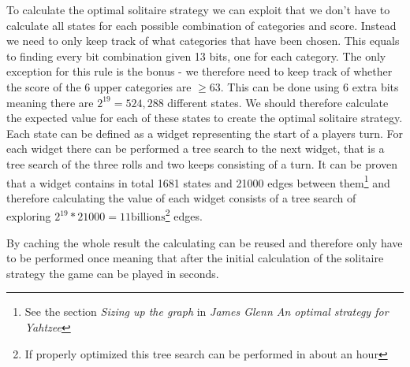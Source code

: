 To calculate the optimal solitaire strategy we can exploit that we don't have to calculate all states for each possible combination of categories and score. Instead we need to only keep track of what categories that have been chosen. This equals to finding every bit combination given 13 bits, one for each category. The only exception for this rule is the bonus - we therefore need to keep track of whether the score of the 6 upper categories are $\geq 63$. This can be done using 6 extra bits meaning there are $2^{19} = 524,288$ different states. We should therefore calculate the expected value for each of these states to create the optimal solitaire strategy.
Each state can be defined as a widget representing the start of a players turn. For each widget there can be performed a tree search to the next widget, that is a tree search of the three rolls and two keeps consisting of a turn. It can be proven that a widget contains in total 1681 states and 21000 edges between them\footnote{See the section \emph{Sizing up the graph} in \emph{James Glenn An optimal strategy for Yahtzee}\cite{glenn2006optimal}} and therefore calculating the value of each widget consists of a tree search of exploring $2^{19} * 21000 = 11\mbox{billions}$\footnote{If properly optimized this tree search can be performed in about an hour} edges. 

By caching the whole result the calculating can be reused and therefore only have to be performed once meaning that after the initial calculation of the solitaire strategy the game can be played in seconds.
